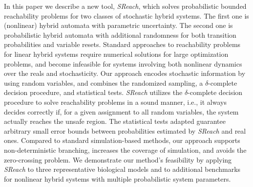 In this paper we describe a new tool, {\it SReach}, which solves probabilistic bounded reachability problems for two classes of stochastic hybrid systems. The first one is (nonlinear) hybrid automata with parametric uncertainty. The second one is probabilistic hybrid automata with additional randomness for both transition probabilities and variable resets. Standard approaches to reachability problems for linear hybrid systems require numerical solutions for large optimization problems, and become infeasible for systems involving both nonlinear dynamics over the reals and stochasticity. Our approach encodes stochastic information by using random variables, and combines the randomized sampling, a $\delta$-complete decision procedure, and statistical tests. {\it SReach} utilizes the $\delta$-complete decision procedure to solve reachability problems in a sound manner, i.e., it always decides correctly if, for a given assignment to all random variables, the system actually reaches the unsafe region. The statistical tests adapted guarantee arbitrary small error bounds between probabilities estimated by {\it SReach} and real ones. Compared to standard simulation-based methods, our approach supports non-deterministic branching, increases the coverage of simulation, and avoids the zero-crossing problem. We demonstrate our method's feasibility by applying {\it SReach} to three representative biological models and to additional benchmarks for nonlinear hybrid systems with multiple probabilistic system parameters.
